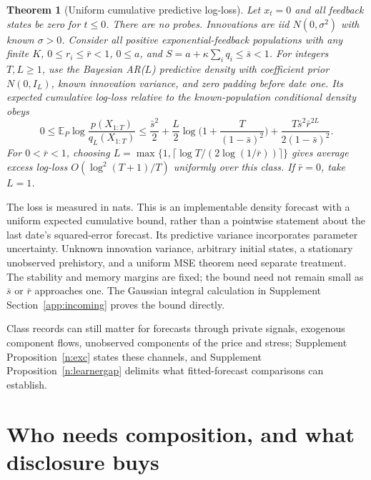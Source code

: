 \documentclass[12pt]{article}
\newtheorem{theorem}{Theorem}[section]
\theoremstyle{definition}
\theoremstyle{remark}
\begin{document}
\begin{theorem}[Uniform cumulative predictive log-loss]\label{n:uniformlog}
Let $x_t=0$ and all feedback states be zero for $t\le0$. There are no probes. Innovations are iid $N(0,\sigma^2)$ with known $\sigma>0$. Consider all positive exponential-feedback populations with any finite $K$, $0\le r_i\le\bar r<1$, $0\le a$, and $S=a+\kappa\sum_iq_i\le\bar s<1$. For integers $T,L\ge1$, use the Bayesian AR($L$) predictive density with coefficient prior $N(0,I_L)$, known innovation variance, and zero padding before date one. Its expected cumulative log-loss relative to the known-population conditional density obeys
\[
0\le\mathbb E_P\log\frac{p(X_{1:T})}{q_L(X_{1:T})}
\le\frac{\bar s^2}{2}+\frac L2\log\Big(1+\frac{T}{(1-\bar s)^2}\Big)
+\frac{T\bar s^2\bar r^{2L}}{2(1-\bar s)^2}.
\]
For $0<\bar r<1$, choosing $L=\max\{1,\lceil\log T/(2\log(1/\bar r))\rceil\}$ gives average excess log-loss $O(\log^2(T+1)/T)$ uniformly over this class. If $\bar r=0$, take $L=1$.
\end{theorem}

The loss is measured in nats. This is an implementable density forecast with a uniform expected cumulative bound, rather than a pointwise statement about the last date's squared-error forecast. Its predictive variance incorporates parameter uncertainty. Unknown innovation variance, arbitrary initial states, a stationary unobserved prehistory, and a uniform MSE theorem need separate treatment. The stability and memory margins are fixed; the bound need not remain small as $\bar s$ or $\bar r$ approaches one. The Gaussian integral calculation in Supplement Section~\ref{app:incoming} proves the bound directly.

Class records can still matter for forecasts through private signals, exogenous component flows, unobserved components of the price and stress; Supplement Proposition~\ref{n:exc} states these channels, and Supplement Proposition~\ref{n:learnergap} delimits what fitted-forecast comparisons can establish.

\section{Who needs composition, and what disclosure buys}\label{n:sup}
\end{document}
